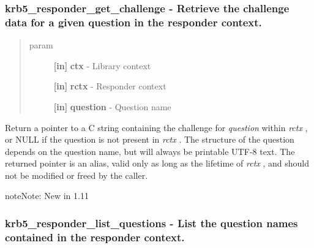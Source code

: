 \documentclass[letterpaper,10pt,english]{sphinxmanual}
\begin{document}
\subsubsection{krb5\_responder\_get\_challenge -  Retrieve the challenge data for a given question in the responder context.}
\label{appdev/refs/api/krb5_responder_get_challenge:krb5-responder-get-challenge-retrieve-the-challenge-data-for-a-given-question-in-the-responder-context}\label{appdev/refs/api/krb5_responder_get_challenge::doc}

\begin{fulllineitems}
\label{appdev/refs/api/krb5_responder_get_challenge:krb5_responder_get_challenge}
\end{fulllineitems}

\begin{quote}\begin{description}
\item[{param}] \leavevmode
\textbf{{[}in{]}} \textbf{ctx} - Library context

\textbf{{[}in{]}} \textbf{rctx} - Responder context

\textbf{{[}in{]}} \textbf{question} - Question name

\end{description}\end{quote}

Return a pointer to a C string containing the challenge for \emph{question} within \emph{rctx} , or NULL if the question is not present in \emph{rctx} . The structure of the question depends on the question name, but will always be printable UTF-8 text. The returned pointer is an alias, valid only as long as the lifetime of \emph{rctx} , and should not be modified or freed by the caller.

\begin{notice}{note}{Note:}
New in 1.11
\end{notice}


\subsubsection{krb5\_responder\_list\_questions -  List the question names contained in the responder context.}
\label{appdev/refs/api/krb5_responder_list_questions::doc}\label{appdev/refs/api/krb5_responder_list_questions:krb5-responder-list-questions-list-the-question-names-contained-in-the-responder-context}
\end{document}
